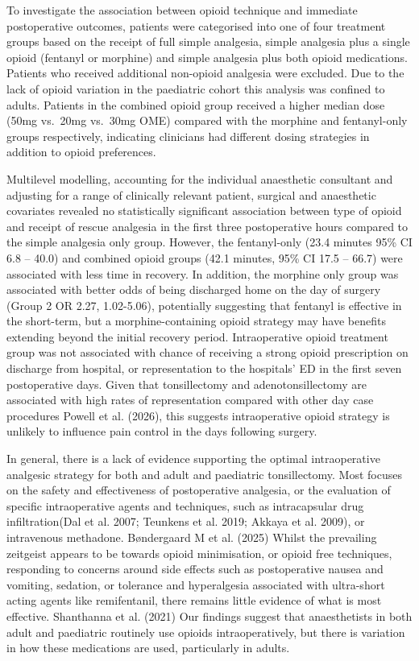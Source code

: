 \documentclass[
  letterpaper,
  DIV=11,
  numbers=noendperiod]{scrreprt}
\begin{document}
To investigate the association between opioid technique and immediate
postoperative outcomes, patients were categorised into one of four
treatment groups based on the receipt of full simple analgesia, simple
analgesia plus a single opioid (fentanyl or morphine) and simple
analgesia plus both opioid medications. Patients who received additional
non-opioid analgesia were excluded. Due to the lack of opioid variation
in the paediatric cohort this analysis was confined to adults. Patients
in the combined opioid group received a higher median dose (50mg
vs.~20mg vs.~30mg OME) compared with the morphine and fentanyl-only
groups respectively, indicating clinicians had different dosing
strategies in addition to opioid preferences.

Multilevel modelling, accounting for the individual anaesthetic
consultant and adjusting for a range of clinically relevant patient,
surgical and anaesthetic covariates revealed no statistically
significant association between type of opioid and receipt of rescue
analgesia in the first three postoperative hours compared to the simple
analgesia only group. However, the fentanyl-only (23.4 minutes 95\% CI
6.8 -- 40.0) and combined opioid groups (42.1 minutes, 95\% CI 17.5 --
66.7) were associated with less time in recovery. In addition, the
morphine only group was associated with better odds of being discharged
home on the day of surgery (Group 2 OR 2.27, 1.02-5.06), potentially
suggesting that fentanyl is effective in the short-term, but a
morphine-containing opioid strategy may have benefits extending beyond
the initial recovery period. Intraoperative opioid treatment group was
not associated with chance of receiving a strong opioid prescription on
discharge from hospital, or representation to the hospitals' ED in the
first seven postoperative days. Given that tonsillectomy and
adenotonsillectomy are associated with high rates of representation
compared with other day case procedures Powell et al. (2026), this
suggests intraoperative opioid strategy is unlikely to influence pain
control in the days following surgery.

In general, there is a lack of evidence supporting the optimal
intraoperative analgesic strategy for both and adult and paediatric
tonsillectomy. Most focuses on the safety and effectiveness of
postoperative analgesia, or the evaluation of specific intraoperative
agents and techniques, such as intracapsular drug infiltration(Dal et
al. 2007; Teunkens et al. 2019; Akkaya et al. 2009), or intravenous
methadone. Bøndergaard M et al. (2025) Whilst the prevailing zeitgeist
appears to be towards opioid minimisation, or opioid free techniques,
responding to concerns around side effects such as postoperative nausea
and vomiting, sedation, or tolerance and hyperalgesia associated with
ultra-short acting agents like remifentanil, there remains little
evidence of what is most effective. Shanthanna et al. (2021) Our
findings suggest that anaesthetists in both adult and paediatric
routinely use opioids intraoperatively, but there is variation in how
these medications are used, particularly in adults.
\end{document}
